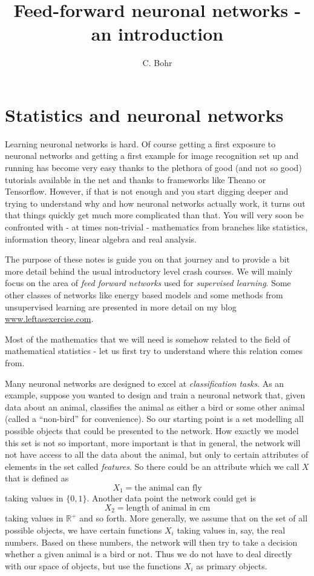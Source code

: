 \documentclass[a4paper, draft]{report}
\author{C. Bohr}
\title{Feed-forward neuronal networks - an introduction}
\numberwithin{section}{chapter}
\numberwithin{equation}{chapter}
\theoremstyle{own}
\theoremstyle{remark}
\newcommand{\R}{\mathbb{R}}
\begin{document}
\maketitle

\tableofcontents



\chapter{Statistics and neuronal networks}

Learning neuronal networks is hard. Of course getting a first exposure to neuronal networks and getting a first example for image recognition set up and running has become very easy thanks to the
plethora of good (and not so good) tutorials available in the net and thanks to frameworks like Theano or Tensorflow. However, if that is not enough and you start digging deeper and trying to understand
why and how neuronal networks actually work, it turns out that things quickly get much more complicated than that. You will very soon be confronted with - at times non-trivial - mathematics from branches like statistics, information theory, linear algebra and real analysis.

The purpose of these notes is guide you on that journey and to provide a bit more detail behind the usual introductory level crash courses. We will mainly focus on the area of {\em feed forward networks} used for {\em supervised learning}. Some other classes of networks like energy based models and some methods from unsupervised learning are presented in more detail on my blog \url{www.leftasexercise.com}.


Most of the mathematics that we will need is somehow related to the field of mathematical statistics - let us first try to understand where this relation comes from.

Many neuronal networks are designed to excel at {\em classification tasks}. As an example, suppose you wanted to design and train a neuronal network that, given data about an animal, classifies the animal as either a bird or some other animal (called a ``non-bird'' for convenience). So our starting point
is a set modelling all possible objects that could be presented to the network. How exactly we model this set is not so important, more important is that in general, the network will not have access to all the data about the animal, but only to certain attributes of elements in the set called {\em features}. So
there could be an attribute which we call $X$ that is defined as
$$
X_1 = \text{the animal can fly}
$$
taking values in $\{0,1\}$. Another data point the network could get is
$$
X_2 = \text{length of animal in cm}
$$
taking values in $\R^+$ and so forth. More generally, we assume that on the set of all possible objects, we have certain functions $X_i$ taking values in, say, the real numbers. Based on these numbers, the network will then try to take a decision whether a given animal is a bird or not. Thus we do not have to deal directly with our space of objects, but use the functions $X_i$ as primary objects.
\end{document}
